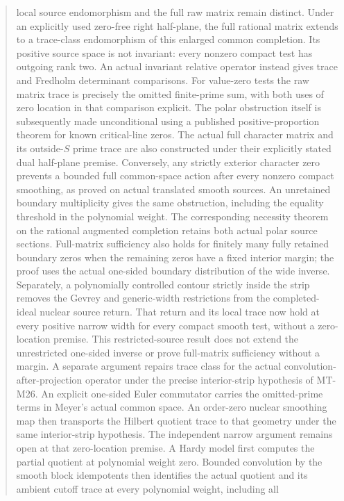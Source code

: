 \documentclass[11pt,a4paper]{article}
\begin{document}
\begin{abstract}
local source endomorphism and the full raw matrix remain distinct.
Under an explicitly used zero-free right half-plane, the full
rational matrix extends to a trace-class endomorphism of this
enlarged common completion. Its positive source space is not
invariant: every nonzero compact test has outgoing rank two.
An actual invariant relative operator instead gives trace and
Fredholm determinant comparisons. For value-zero tests the raw
matrix trace is precisely the omitted finite-prime sum, with
both uses of zero location in that comparison explicit.
The polar obstruction itself is subsequently made
unconditional using a published positive-proportion theorem
for known critical-line zeros. The actual full character
matrix and its outside-$S$ prime trace are also constructed
under their explicitly stated dual half-plane premise.
Conversely, any strictly exterior character zero prevents a
bounded full common-space action after every nonzero compact
smoothing, as proved on actual translated smooth sources.
An unretained boundary multiplicity gives the same obstruction,
including the equality threshold in the polynomial weight.
The corresponding necessity theorem on the rational augmented
completion retains both actual polar source sections.
Full-matrix sufficiency also holds for finitely many fully retained
boundary zeros when the remaining zeros have a fixed interior margin;
the proof uses the actual one-sided boundary distribution of the
wide inverse. Separately, a polynomially controlled contour strictly
inside the strip removes the Gevrey and generic-width restrictions
from the completed-ideal nuclear source return. That return and its
local trace now hold at every positive narrow width for every compact
smooth test, without a zero-location premise. This restricted-source
result does not extend the unrestricted one-sided inverse or prove
full-matrix sufficiency without a margin.
A separate argument repairs trace class for
the actual convolution-after-projection operator under the precise
interior-strip hypothesis of MT-M26. An explicit one-sided Euler
commutator carries the omitted-prime terms in Meyer's actual common
space. An order-zero nuclear smoothing map then transports the
Hilbert quotient trace to that geometry under the same interior-strip
hypothesis. The independent narrow argument remains open at that
zero-location premise. A Hardy model first computes the partial
quotient at polynomial weight zero. Bounded convolution by the
smooth block idempotents then identifies the actual quotient and
its ambient cutoff trace at every polynomial weight, including all

\end{abstract}
\end{document}
